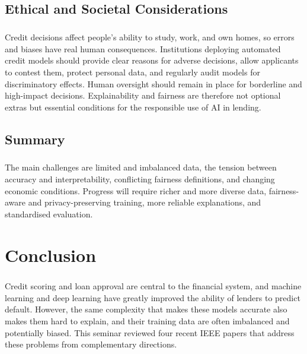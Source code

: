 \documentclass[12pt,a4paper,final]{extreport}
\begin{document}
\section{Ethical and Societal Considerations}

\paragraph{} Credit decisions affect people's ability to study, work, and own homes, so errors and biases have real human consequences. Institutions deploying automated credit models should provide clear reasons for adverse decisions, allow applicants to contest them, protect personal data, and regularly audit models for discriminatory effects. Human oversight should remain in place for borderline and high-impact decisions. Explainability and fairness are therefore not optional extras but essential conditions for the responsible use of AI in lending.

\section{Summary}

\paragraph{} The main challenges are limited and imbalanced data, the tension between accuracy and interpretability, conflicting fairness definitions, and changing economic conditions. Progress will require richer and more diverse data, fairness-aware and privacy-preserving training, more reliable explanations, and standardised evaluation.

\chapter{Conclusion}

\paragraph{} Credit scoring and loan approval are central to the financial system, and machine learning and deep learning have greatly improved the ability of lenders to predict default. However, the same complexity that makes these models accurate also makes them hard to explain, and their training data are often imbalanced and potentially biased. This seminar reviewed four recent IEEE papers that address these problems from complementary directions.
\end{document}

